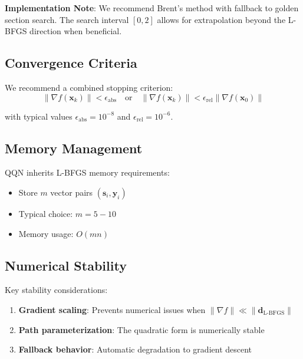 \textbf{Implementation Note}: We recommend Brent's method with fallback to golden section search. The search interval \([0, 2]\) allows for extrapolation beyond the L-BFGS direction when beneficial.

\hypertarget{convergence-criteria}{%
\subsection{Convergence Criteria}\label{convergence-criteria}}

We recommend a combined stopping criterion:
\[\|\nabla f(\mathbf{x}_k)\| < \epsilon_{\text{abs}} \quad \text{or} \quad \|\nabla f(\mathbf{x}_k)\| < \epsilon_{\text{rel}} \|\nabla f(\mathbf{x}_0)\|\]

with typical values \(\epsilon_{\text{abs}} = 10^{-8}\) and \(\epsilon_{\text{rel}} = 10^{-6}\).

\hypertarget{memory-management}{%
\subsection{Memory Management}\label{memory-management}}

QQN inherits L-BFGS memory requirements:

\begin{itemize}
\tightlist
\item
  Store \(m\) vector pairs \((\mathbf{s}_i, \mathbf{y}_i)\)
\item
  Typical choice: \(m = 5-10\)
\item
  Memory usage: \(O(mn)\)
\end{itemize}

\hypertarget{numerical-stability}{%
\subsection{Numerical Stability}\label{numerical-stability}}

Key stability considerations:

\begin{enumerate}
\def\labelenumi{\arabic{enumi}.}
\tightlist
\item
  \textbf{Gradient scaling}: Prevents numerical issues when \(\|\nabla f\| \ll \|\mathbf{d}_{\text{L-BFGS}}\|\)
\item
  \textbf{Path parameterization}: The quadratic form is numerically stable
\item
  \textbf{Fallback behavior}: Automatic degradation to gradient descent
\end{enumerate}

